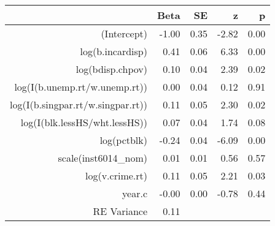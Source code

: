 \begin{table}[ht]
\centering
\begin{tabular}{rrrrr}
  \hline
 & Beta & SE & z & p \\ 
  \hline
(Intercept) & -1.00 & 0.35 & -2.82 & 0.00 \\ 
  log(b.incardisp) & 0.41 & 0.06 & 6.33 & 0.00 \\ 
  log(bdisp.chpov) & 0.10 & 0.04 & 2.39 & 0.02 \\ 
  log(I(b.unemp.rt/w.unemp.rt)) & 0.00 & 0.04 & 0.12 & 0.91 \\ 
  log(I(b.singpar.rt/w.singpar.rt)) & 0.11 & 0.05 & 2.30 & 0.02 \\ 
  log(I(blk.lessHS/wht.lessHS)) & 0.07 & 0.04 & 1.74 & 0.08 \\ 
  log(pctblk) & -0.24 & 0.04 & -6.09 & 0.00 \\ 
  scale(inst6014\_nom) & 0.01 & 0.01 & 0.56 & 0.57 \\ 
  log(v.crime.rt) & 0.11 & 0.05 & 2.21 & 0.03 \\ 
  year.c & -0.00 & 0.00 & -0.78 & 0.44 \\ 
  RE Variance & 0.11 &  &  &  \\ 
   \hline
\end{tabular}
\end{table}
